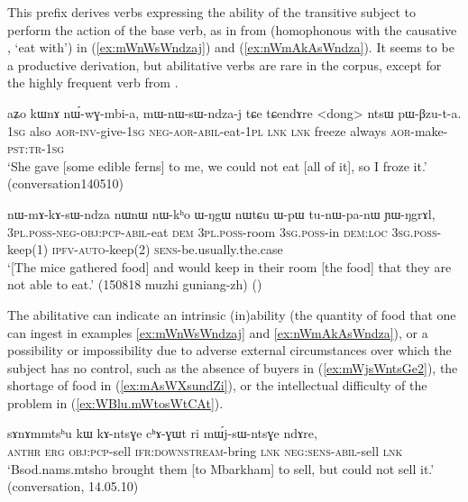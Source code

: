 This prefix derives verbs expressing the ability of the transitive subject to perform the action of the base verb, as in  from  (homophonous with the causative , `eat with') in (\ref{ex:mWnWsWndzaj}) and (\ref{ex:nWmAkAsWndza}). It seems to be a productive derivation, but abilitative verbs are rare in the corpus, except for the highly frequent verb  from .

\begin{exe}
\ex \label{ex:mWnWsWndzaj}
\gll aʑo kɯnɤ nɯ́-wɣ-mbi-a, mɯ-nɯ-sɯ-ndza-j tɕe tɕendɤre <dong> ntsɯ pɯ-βzu-t-a. \\
\textsc{1sg} also \textsc{aor}-\textsc{inv}-give-\textsc{1sg}  \textsc{neg}-\textsc{aor}-\textsc{abil}-eat-\textsc{1pl} \textsc{lnk} \textsc{lnk} freeze always \textsc{aor}-make-\textsc{pst}:\textsc{tr}-\textsc{1sg} \\
\glt `She gave [some edible ferns] to me, we could not eat [all of it], so I froze it.' (conversation140510)
\end{exe}

\begin{exe}
\ex \label{ex:nWmAkAsWndza}
\gll nɯ-mɤ-kɤ-sɯ-ndza nɯnɯ nɯ-kʰo ɯ-ŋgɯ nɯtɕu ɯ-pɯ tu-nɯ-pa-nɯ ɲɯ-ŋgrɤl, \\
\textsc{3pl}.\textsc{poss}-\textsc{neg}-\textsc{obj}:\textsc{pcp}-\textsc{abil}-eat \textsc{dem} \textsc{3pl}.\textsc{poss}-room \textsc{3sg}.\textsc{poss}-in \textsc{dem}:\textsc{loc} \textsc{3sg}.\textsc{poss}-keep(1) \textsc{ipfv}-\textsc{auto}-keep(2) \textsc{sens}-be.usually.the.case \\
\glt `[The mice gathered food] and would keep in their room [the food] that they are not able to eat.' (150818 muzhi guniang-zh)
()
\end{exe}

The abilitative can indicate an intrinsic (in)ability (the quantity of food that one can ingest in examples \ref{ex:mWnWsWndzaj} and \ref{ex:nWmAkAsWndza}), or a possibility or impossibility due to adverse external circumstances over which the subject has no control, such as the absence of buyers in (\ref{ex:mWjsWntsGe2}), the shortage of food in (\ref{ex:mAsWXsundZi}), or the intellectual difficulty of the problem in (\ref{ex:WBlu.mWtosWtCAt}).

 \begin{exe}
\ex \label{ex:mWjsWntsGe2}
 \gll   sɤnɤmmtsʰu kɯ kɤ-ntsɣe cʰɤ-ɣɯt ri mɯ́j-sɯ-ntsɣe ndɤre, \\
  \textsc{anthr} \textsc{erg} \textsc{obj}:\textsc{pcp}-sell \textsc{ifr}:\textsc{downstream}-bring \textsc{lnk} \textsc{neg}:\textsc{sens}-\textsc{abil}-sell \textsc{lnk} \\
\glt `Bsod.nams.mtsho brought them [to Mbarkham] to sell, but could not sell it.' (conversation, 14.05.10)
 \end{exe}
 
